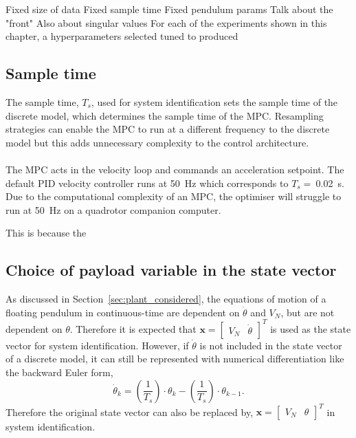 
        Fixed size of data
        Fixed sample time
        Fixed pendulum params
        Talk about the "front"
        Also about singular values
        For each of the experiments shown in this chapter, a hyperparameters selected tuned to produced

    \subsection{Sample time}
        The sample time, $T_s$, used for system identification sets the sample time of the discrete model, 
        which determines the sample time of the MPC.
        Resampling strategies can enable the MPC to run at a different frequency to the discrete model but this adds unnecessary complexity to the control architecture.
        
        \paragraph{}
        The MPC acts in the velocity loop and commands an acceleration setpoint.
        The default PID velocity controller runs at \SI{50}{\hertz} which corresponds to $T_s =~$\SI{0.02}{\second}.
        Due to the computational complexity of an MPC, the optimiser will struggle to run at \SI{50}{\hertz} on a quadrotor companion computer.
        
        This is because the  

    \subsection{Choice of payload variable in the state vector}
        As discussed in Section~\ref{sec:plant_considered}, 
        the equations of motion of a floating pendulum in continuous-time are dependent on $\dot{\theta}$ and $V_N$, 
        but are not dependent on $\theta$.
        Therefore it is expected that 
        $
        \bm{x} = \begin{bmatrix}
            V_N & \dot{\theta}
        \end{bmatrix}^T
        $
        is used as the state vector for system identification.
        However, if $\dot{\theta}$ is not included in the state vector of a discrete model, 
        it can still be represented with numerical differentiation like the backward Euler form,
        \begin{equation}
            \dot{\theta}_k = (\frac{1}{T_s}) \cdot \theta_k - (\frac{1}{T_s}) \cdot \theta_{k-1} .
        \end{equation}
        Therefore the original state vector can also be replaced by,
        $
            \bm{x} = \begin{bmatrix}
                V_N & \theta
            \end{bmatrix}^T
        $
        in system identification.

